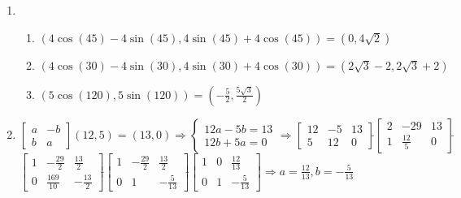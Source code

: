 \documentclass[12pt]{article}
\begin{document}
\begin{enumerate}
\begin{enumerate}
    \end{enumerate}

    \setcounter{enumi}{44}

  \item

    \begin{enumerate}

      \item $(4\cos(45)-4\sin(45), 4\sin(45)+4\cos(45))=(0,4\sqrt{2})$

      \item $(4\cos(30)-4\sin(30),4\sin(30)+4\cos(30))=(2\sqrt{3}-2,2\sqrt{3}+2)$

      \item $(5\cos(120),5\sin(120))=\left(-\frac{5}{2},\frac{5\sqrt{3}}{2}\right)$

    \end{enumerate}

    \setcounter{enumi}{47}

  \item $\begin{bmatrix} a & -b\\ b & a \end{bmatrix}(12,5)=(13,0)\Rightarrow \left\{\begin{array}{c} 12a-5b=13\\12b+5a=0\end{array}\Rightarrow\left[ \begin{array}{cc|c} 12 & -5 & 13\\ 5 & 12 & 0  \end{array} \right]\widetilde{ }\left[ \begin{array}{cc|c} 2 & -29 & 13\\ 1 & \frac{12}{5} & 0  \end{array} \right]\widetilde{ }$\\$\left[ \begin{array}{cc|c} 1 & -\frac{29}{2} & \frac{13}{2}\\ 0 & \frac{169}{10} & -\frac{13}{2}  \end{array} \right]\widetilde{ }\left[ \begin{array}{cc|c} 1 & -\frac{29}{2} & \frac{13}{2}\\0 & 1 & -\frac{5}{13} \end{array} \right]\widetilde{ }\left[ \begin{array}{cc|c} 1 & 0 & \frac{12}{13}\\0 & 1 & -\frac{5}{13}  \end{array} \right]\Rightarrow a=\frac{12}{13},b=-\frac{5}{13}$


\end{enumerate}
\end{document}
